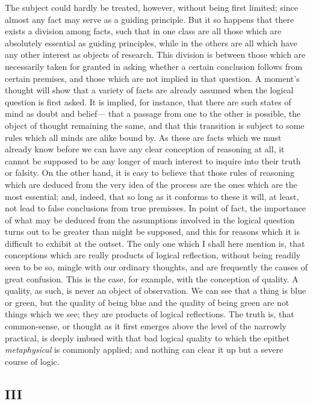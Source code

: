 \documentclass[]{article}
\begin{document}
The subject could hardly be treated, however, without being first limited; since almost any fact may serve as a guiding principle. But it so happens that there exists a division among facts, such that in one class are all those which are absolutely essential as guiding principles, while in the others are all which have any other interest as objects of research. This division is between those which are necessarily taken for granted in asking whether a certain conclusion follows from certain premises, and those which are not implied in that question. A moment's thought will show that a variety of facts are already assumed when the logical question is first asked. It is implied, for instance, that there are such states of mind as doubt and belief--- that a passage from one to the other is possible, the object of thought remaining the same, and that this transition is subject to some rules which all minds are alike bound by. As these are facts which we must already know before we can have any clear conception of reasoning at all, it cannot be supposed to be any longer of much interest to inquire into their truth or falsity. On the other hand, it is easy to believe that those rules of reasoning which are deduced from the very idea of the process are the ones which are the most essential; and, indeed, that so long as it conforms to these it will, at least, not lead to false conclusions from true premisses. In point of fact, the importance of what may be deduced from the assumptions involved in the logical question turns out to be greater than might be supposed, and this for reasons which it is difficult to exhibit at the outset. The only one which I shall here mention is, that conceptions which are really products of logical reflection, without being readily seen to be so, mingle with our ordinary thoughts, and are frequently the causes of great confusion. This is the case, for example, with the conception of quality. A quality, as such, is never an object of observation. We can see that a thing is blue or green, but the quality of being blue and the quality of being green are not things which we see; they are products of logical reflections. The truth is, that common-sense, or thought as it first emerges above the level of the narrowly practical, is deeply imbued with that bad logical quality to which the epithet \emph{metaphysical} is commonly applied; and nothing can clear it up but a severe course of logic.

\subsection*{III}
\end{document}
